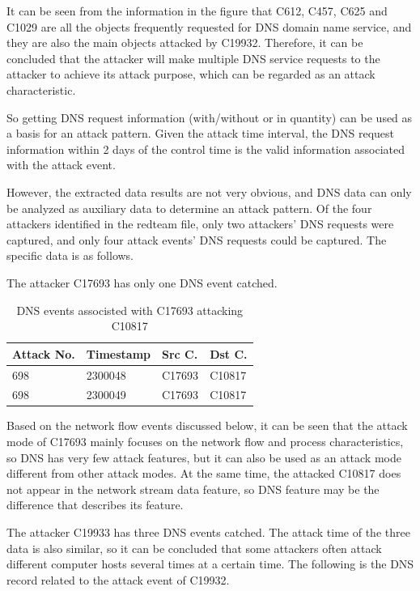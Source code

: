 \documentclass[12pt,journal,draftcls,doublespace, letterpaper,onecolumn]{IEEEtran}
\begin{document}
It can be seen from the information in the figure that C612, C457, C625 and C1029 are all the objects frequently requested for DNS domain name service, and they are also the main objects attacked by C19932. Therefore, it can be concluded that the attacker will make multiple DNS service requests to the attacker to achieve its attack purpose, which can be regarded as an attack characteristic.

So getting DNS request information (with/without or in quantity) can be used as a basis for an attack pattern. Given the attack time interval, the DNS request information within 2 days of the control time is the valid information associated with the attack event.

However, the extracted data results are not very obvious, and DNS data can only be analyzed as auxiliary data to determine an attack pattern. Of the four attackers identified in the redteam file, only two attackers' DNS requests were captured, and only four attack events' DNS requests could be captured. The specific data is as follows.

The attacker C17693 has only one DNS event catched.

\begin{table}[h]
	\caption{DNS events associsted with C17693 attacking C10817}
	\vspace{1pt}
	\centering
	\begin{tabular}{p{2.5cm}p{2.5cm}p{2.5cm}p{2.5cm}}
		\hline
		Attack No. & Timestamp & Src C. & Dst C. \\
		\hline
		698 & 2300048 & C17693 & C10817\\
		698 & 2300049 & C17693 & C10817\\
		\hline       
	\end{tabular}
	\label{bs2}
\end{table}

Based on the network flow events discussed below, it can be seen that the attack mode of C17693 mainly focuses on the network flow and process characteristics, so DNS has very few attack features, but it can also be used as an attack mode different from other attack modes. At the same time, the attacked C10817 does not appear in the network stream data feature, so DNS feature may be the difference that describes its feature.

The attacker C19933 has three DNS events catched. 
The attack time of the three data is also similar, so it can be concluded that some attackers often attack different computer hosts several times at a certain time. The following is the DNS record related to the attack event of C19932.
\end{document}
